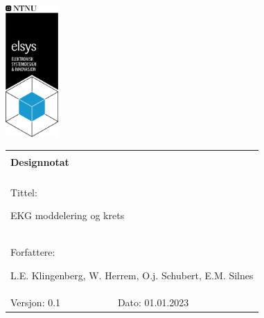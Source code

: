 \begin{minipage}[c]{0.15\textwidth}
\includegraphics[width=2.0cm]{Bilder/elsys_pos_staaende_ntnu.png}  
\end{minipage}
\begin{minipage}[c]{0.85\textwidth}

\renewcommand{\arraystretch}{1.7}
\large 
\begin{tabularx}{\textwidth}{|X|X|}
\hline
\multicolumn{2}{|l|}{} \\
\multicolumn{2}{|l|}{\huge \textbf{Designnotat}} \\
\multicolumn{2}{|l|}{}  \\
\hline
\multicolumn{2}{|l|}{Tittel: 

EKG moddelering og krets
} \\
\hline
\multicolumn{2}{|l|}{Forfattere: 

L.E. Klingenberg, W. Herrem, O.j. Schubert, E.M. Silnes
} \\
\hline

Versjon: 0.1 & Dato: 01.01.2023
\\
\hline 
\end{tabularx}
\end{minipage}
\normalsize